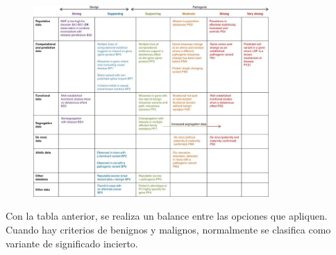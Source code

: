\begin{figure}[htbp]
\centering
\includegraphics[width = 0.8\textwidth]{figs/acmg-guideline-table.jpg}
\end{figure}

Con la tabla anterior, se realiza un balance entre las opciones que apliquen. Cuando hay criterios de benignos y malignos, normalmente se clasifica como variante de significado incierto. 